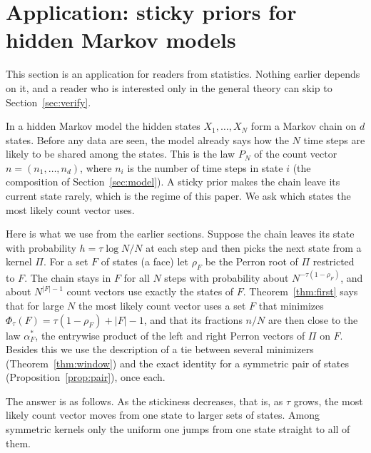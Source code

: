 \section{Application: sticky priors for hidden Markov models}\label{sec:sticky}

This section is an application for readers from statistics. Nothing earlier
depends on it, and a reader who is interested only in the general theory
can skip to Section~\ref{sec:verify}.

In a hidden Markov model the hidden states $X_1,\dots,X_N$ form a Markov chain
on $d$ states. Before any data are seen, the model already says how the $N$
time steps are likely to be shared among the states. This is the law $P_N$ of
the count vector $n=(n_1,\dots,n_d)$, where $n_i$ is the number of time steps in
state $i$ (the composition of Section~\ref{sec:model}). A sticky prior makes
the chain leave its current state rarely, which is the regime of this paper.
We ask which states the most likely count vector uses.

Here is what we use from the earlier sections. Suppose the chain leaves its
state with probability $h=\tau\log N/N$ at each step and then picks the next
state from a kernel $\Pi$. For a set $F$ of states (a face) let $\rho_F$ be
the Perron root of $\Pi$ restricted to $F$. The chain stays in $F$ for all $N$
steps with probability about $N^{-\tau(1-\rho_F)}$, and about $N^{|F|-1}$ count
vectors use exactly the states of $F$. Theorem~\ref{thm:first} says that for
large $N$ the most likely count vector uses a set $F$ that minimizes
$\Phi_\tau(F)=\tau(1-\rho_F)+|F|-1$, and that its fractions $n/N$ are then
close to the law $\alpha^*_F$, the entrywise product of the left and right
Perron vectors of $\Pi$ on $F$. Besides this we use the description of a tie
between several minimizers (Theorem~\ref{thm:window}) and the exact identity
for a symmetric pair of states (Proposition~\ref{prop:pair}), once each.

The answer is as follows. As the stickiness decreases, that is, as $\tau$
grows, the most likely count vector moves from one state to larger sets of
states. Among symmetric kernels only the uniform one jumps from one state
straight to all of them.


